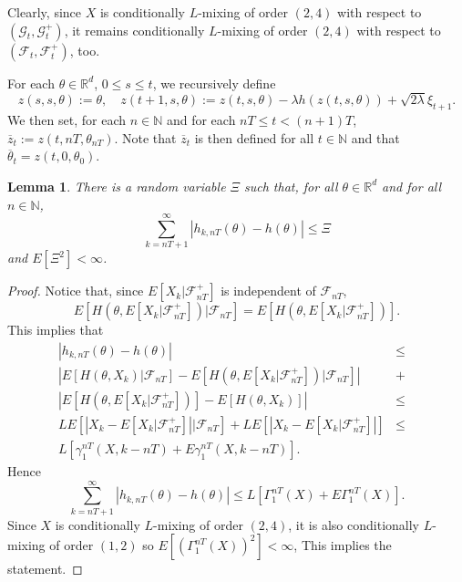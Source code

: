 \documentclass[a4paper,draft]{article}
\newtheorem{lemma}[theorem]{Lemma}
\begin{document}
Clearly, since
$X$ is conditionally $L$-mixing of order $(2,4)$ with respect to
$(\mathcal{G}_t,\mathcal{G}^+_t)$, it remains 
conditionally $L$-mixing of order $(2,4)$ with respect to
$(\mathcal{F}_t,\mathcal{F}^+_t)$, too.

For each $\theta\in\mathbb{R}^d$, $0\leq s\leq t$, we recursively define
$$ 
z(s,s,\theta):=\theta,\quad z(t+1,s,\theta):=z(t,s,\theta)
-\lambda h(z(t,s,\theta))+\sqrt{2\lambda}\xi_{t+1}.
$$
We then set, for each $n\in\mathbb{N}$ and for each
$nT\leq t<(n+1)T$, $\overline{z}_t:=z(t,nT,\theta_{nT})$.
Note that $\overline{z}_t$ is then defined for all $t\in\mathbb{N}$
and that $\overline{\theta}_t=z(t,0,\theta_0)$.

\begin{lemma}\label{kaaka}
There is a random variable $\Xi$ such that, for all $\theta\in\mathbb{R}^d$
and for all $n\in\mathbb{N}$,
$$
\sum_{k=nT+1}^{\infty}|h_{k,nT}(\theta)-h(\theta)|\leq \Xi
$$
and $E[\Xi^2]<\infty$.
\end{lemma}
\begin{proof}
Notice that, since $E[X_k\vert\mathcal{F}_{nT}^+]$ is independent
of $\mathcal{F}_{nT}$,
$$
E[H(\theta,E[X_k\vert\mathcal{F}_{nT}^+])\vert\mathcal{F}_{nT}]=
E[H(\theta, E[X_k\vert\mathcal{F}_{nT}^+])].
$$
This implies that
\begin{eqnarray*}
|h_{k,nT}(\theta)-h(\theta)| &\leq&\\ 
\left|E[H(\theta,X_k)|\mathcal{F}_{nT}]-
E[H(\theta,E[X_k\vert\mathcal{F}_{nT}^+])\vert\mathcal{F}_{nT}]\right|
&+&\\
\left|E[H(\theta, E[X_k\vert\mathcal{F}_{nT}^+])]-E[H(\theta,X_k)]\right| &\leq&\\
LE[|X_k-E[X_k\vert\mathcal{F}_{nT}^+]|\vert\mathcal{F}_{nT}]
+LE[|X_k-E[X_k\vert\mathcal{F}_{nT}^+]|] &\leq&\\
L[\gamma_1^{nT}(X,k-nT) + E\gamma_1^{nT}(X,k-nT)]. & &
\end{eqnarray*}
Hence 
$$
\sum_{k=nT+1}^{\infty}|h_{k,nT}(\theta)-h(\theta)|\leq L[\Gamma_1^{nT}(X)
+E\Gamma_1^{nT}(X)].
$$
Since $X$ is conditionally $L$-mixing of order $(2,4)$, it is also
conditionally $L$-mixing of order $(1,2)$ so
$E[(\Gamma_1^{nT}(X))^2]<\infty$, This implies the statement.
\end{proof}
\end{document}
